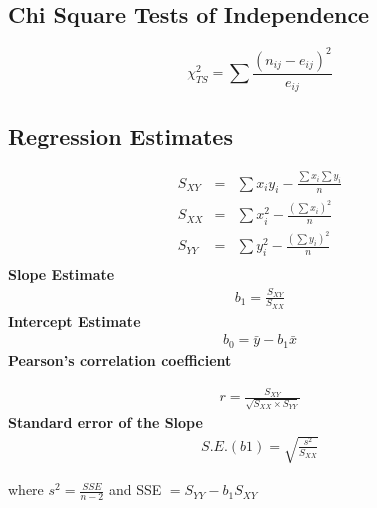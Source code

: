 \documentclass[a4paper,12pt]{article}
\begin{document}
\subsection*{Chi Square Tests of Independence}
\[\chi^2_{TS} =  \sum \frac{(n_{ij} - e_{ij})^2}{e_{ij}}\]
\subsection*{Regression Estimates}

\begin{eqnarray*}
	S_{XY} &=&
	\sum x_iy_i - \frac{\sum x_i\sum y_i}{n}\\
	S_{XX} &=&
	\sum x_i^2 - \frac{(\sum x_i)^2}{n}\\
	S_{YY} &=&
	\sum y_i^2 - \frac{(\sum y_i)^2}{n}\\
\end{eqnarray*}
{\bf Slope Estimate}
\begin{eqnarray*}
	b_1 = \frac{S_{XY}}{S_{XX}}
\end{eqnarray*}
{\bf Intercept Estimate}
\begin{eqnarray*}
	b_0 = \bar{y} -b_1\bar{x}
\end{eqnarray*}
{\bf Pearson's correlation coefficient}

\begin{eqnarray*}
	r = \frac{S_{XY}}{\sqrt{S_{XX} \times S_{YY}}}
\end{eqnarray*}
{\bf Standard error of the Slope}
\begin{eqnarray*}
	S.E.(b1) = \sqrt{\frac{s^2}{S_{XX}}}
\end{eqnarray*}

where $s^2 = \frac{SSE}{n-2}$
and SSE $= S_{YY} - b_1S_{XY}$
\end{document}
